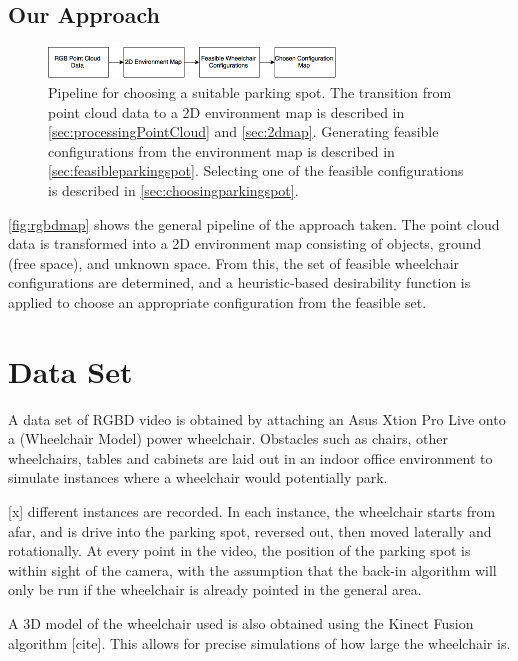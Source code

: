 \subsection{Our Approach}
\begin{figure}
\centering
\includegraphics[width=3in]{figures/rgbdmap.png}
\caption{Pipeline for choosing a suitable parking spot.
The transition from point cloud data to a 2D environment map is described in
\autoref{sec:processingPointCloud} and \autoref{sec:2dmap}. Generating feasible configurations from the
environment map is described in \autoref{sec:feasibleparkingspot}. Selecting one
of the feasible configurations is described in
\autoref{sec:choosingparkingspot}.}
\label{fig:rgbdmap}
\end{figure}

\autoref{fig:rgbdmap} shows the general pipeline of the approach taken. The
point cloud data is transformed into a 2D environment map consisting of objects,
ground (free space), and unknown space. From this, the set of feasible
wheelchair configurations are determined, and a heuristic-based desirability
function is applied to choose an appropriate configuration from the feasible set.



\section{Data Set}
\label{sec:rgbddataset}
A data set of RGBD video is obtained by attaching an Asus Xtion Pro Live onto a
(Wheelchair Model) power wheelchair. Obstacles such as chairs, other
wheelchairs, tables and cabinets are laid out in an indoor office environment to
simulate instances where a wheelchair would potentially park.

[x] different instances are recorded. In each instance, the wheelchair starts
from afar, and is drive into the parking spot, reversed out, then moved
laterally and rotationally. At every point in the video, the position of the
parking spot is within sight of the camera, with the assumption that the back-in
algorithm will only be run if the wheelchair is already pointed in the general
area.

A 3D model of the wheelchair used is also obtained using the Kinect Fusion
algorithm [cite]. This allows for precise simulations of how large the
wheelchair is.

